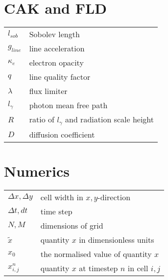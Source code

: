 \begin{multicols}{2}
\section*{CAK and FLD}
\begin{tabular}{ll}
$l_{sob}$          & Sobolev length \\
$g_{line}$         & line acceleration\\
$\kappa_e$         & electron opacity \\
$q$                & line quality factor  \\
$\lambda$          & flux limiter \\
$l_\gamma$		   & photon mean free path \\
$R$                & ratio of $l_\gamma$ and radiation scale height\\
$D$                & diffusion coefficient\\
\end{tabular}

\section*{Numerics}
\begin{tabular}{ll}
$\Delta x, \Delta y$       & cell width in $x,y$-direction\\
$\Delta t, dt$	 & time step \\
$N,M$            & dimensions of grid \\
$\tilde{x}$      & quantity $x$ in dimensionless units \\
$x_0$		     & the normalised value of quantity $x$ \\
$x_{i,j}^n$	     & quantity $x$ at timestep $n$ in cell $i,j$ \\
\end{tabular}


\end{multicols}
